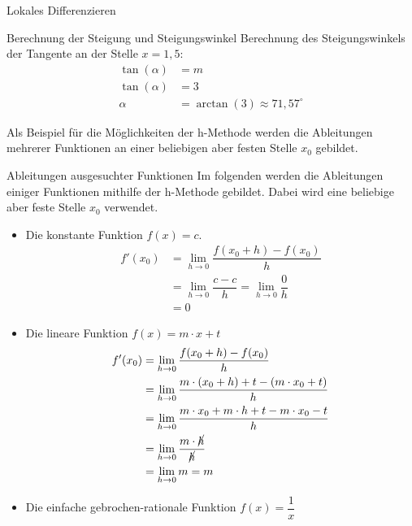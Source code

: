 \begin{section}{Lokales Differenzieren}
\begin{bsp*}{Berechnung der Steigung und Steigungswinkel}{}
Berechnung des Steigungswinkels der Tangente an der Stelle $x=1,5 $: 
\begin{equation*}
\begin{split}
\tan{(\alpha)} &= m\\
\tan{(\alpha)} &= 3\\
\alpha &= \arctan{(3)} \approx 71,57^{\circ}  
\end{split}
\end{equation*}
\end{bsp*}
Als Beispiel für die Möglichkeiten der h-Methode werden die Ableitungen mehrerer Funktionen an einer beliebigen aber festen Stelle $x_0$ gebildet.
\begin{bsp*}{Ableitungen ausgesuchter Funktionen}{}
Im folgenden werden die Ableitungen einiger Funktionen mithilfe der h-Methode gebildet. Dabei wird eine beliebige aber feste Stelle $x_0$ verwendet.
\begin{itemize}
    \item Die konstante Funktion $f(x) = c$. 
    \begin{equation*}
\begin{split}
f'(x_0)&= \lim_{h\rightarrow 0} \dfrac{f(x_0 +h) - f(x_0)}{h}\\
&= \lim_{h\rightarrow 0} \dfrac{c-c}{h} = \lim_{h\rightarrow 0} \dfrac{0}{h}  \\
 &= 0
\end{split}
\end{equation*}
\item Die lineare Funktion $f(x) = m\cdot x + t$
\begin{equation*}
\begin{split}
f'(x_0)&= \lim_{h\rightarrow 0} \dfrac{f(x_0 +h) - f(x_0)}{h}\\
&= \lim_{h\rightarrow 0} \dfrac{m\cdot (x_0 + h) + t -(m\cdot x_0 +t)}{h} \\
 &=  \lim_{h\rightarrow 0} \dfrac{m\cdot x_0 + m\cdot h + t - m\cdot x_0 - t }{h} \\
 &= \lim_{h\rightarrow 0} \dfrac{m\cdot \cancel{h}}{\cancel{h}} \\
 &= \lim_{h\rightarrow 0} m = m
\end{split}
\end{equation*}
\item Die einfache gebrochen-rationale Funktion $f(x) = \dfrac{1}{x}$
\begin{equation*}
\begin{split}

\end{split}
\end{equation*}
\end{itemize}
\end{bsp*}
\end{section}
